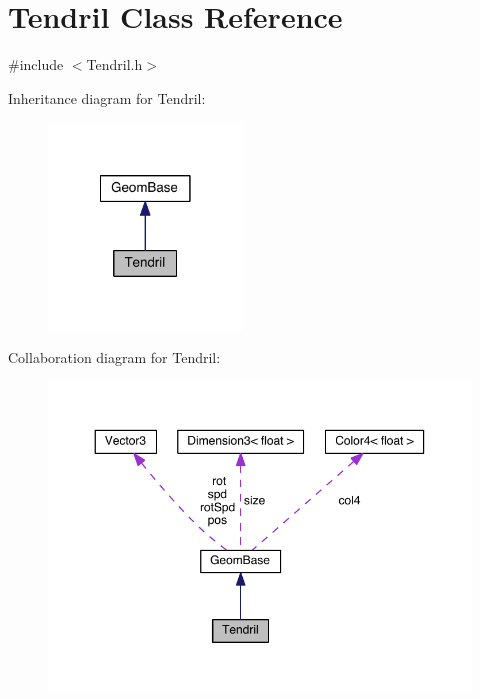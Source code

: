 \hypertarget{class_tendril}{\section{Tendril Class Reference}
\label{class_tendril}
}


{\ttfamily \#include $<$Tendril.\-h$>$}



Inheritance diagram for Tendril\-:
\nopagebreak
\begin{figure}[H]
\begin{center}
\leavevmode
\includegraphics[width=146pt]{class_tendril__inherit__graph}
\end{center}
\end{figure}


Collaboration diagram for Tendril\-:
\nopagebreak
\begin{figure}[H]
\begin{center}
\leavevmode
\includegraphics[width=350pt]{class_tendril__coll__graph}
\end{center}
\end{figure}
